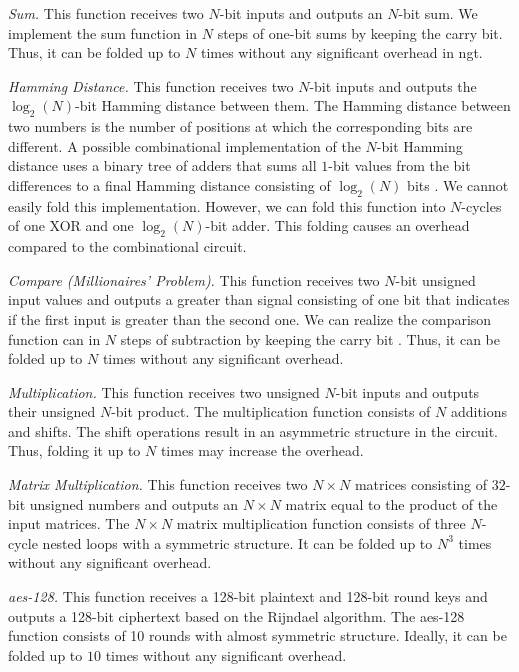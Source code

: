 \textit{Sum.} This function receives two $N$-bit inputs and outputs an $N$-bit sum.
We implement the sum function in $N$ steps of one-bit sums by keeping the carry bit.
Thus, it can be folded up to $N$ times without any significant overhead in \acrfull{ngt}.

\textit{Hamming Distance.} This function receives two $N$-bit inputs and outputs the $\log_2(N)$-bit Hamming distance between them.
The Hamming distance between two numbers is the number of positions at which the corresponding bits are different.
A possible combinational implementation of the $N$-bit Hamming distance uses a binary tree of adders that sums all $1$-bit values from the bit differences to a final Hamming distance consisting of $\log_2(N)$ bits \cite{boyar2006concrete}.
We cannot easily fold this implementation.
However, we can fold this function into $N$-cycles of one XOR and one $\log_2(N)$-bit adder.
This folding causes an overhead compared to the combinational circuit.

\textit{Compare (Millionaires' Problem).} This function receives two $N$-bit unsigned input values and outputs a greater than signal consisting of one bit that indicates if the first input is greater than the second one.
We can realize the comparison function can in $N$ steps of subtraction by keeping the carry bit \cite{kolesnikov2009improved}.
Thus, it can be folded up to $N$ times without any significant overhead.

\textit{Multiplication.} This function receives two unsigned $N$-bit inputs and outputs their unsigned $N$-bit product.
The multiplication function consists of $N$ additions and shifts.
The shift operations result in an asymmetric structure in the circuit.
Thus, folding it up to $N$ times may increase the overhead.

\textit{Matrix Multiplication.} This function receives two $N\times N$ matrices consisting of $32$-bit unsigned numbers and outputs an $N\times N$ matrix equal to the product of the input matrices.
The $N\times N$ matrix multiplication function consists of three $N$-cycle nested loops with a symmetric structure.
It can be folded up to $N^3$ times without any significant overhead.

\textit{\acrshort{aes}-128.} This function receives a 128-bit plaintext and 128-bit round keys and outputs a 128-bit ciphertext based on the Rijndael algorithm.
The \acrshort{aes}-128 function consists of 10 rounds with almost symmetric structure.
Ideally, it can be folded up to $10$ times without any significant overhead.

